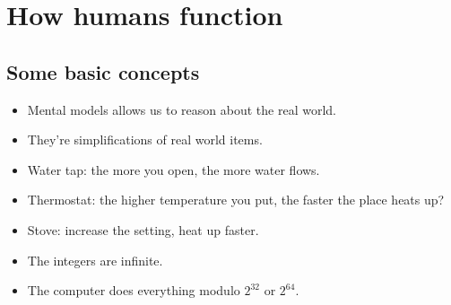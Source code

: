 \mode*




\section{How humans function}

\subsection{Some basic concepts}

\begin{frame}
  \begin{definition}
    \begin{itemize}
      \item Mental models allows us to reason about the real world.
      \item They're simplifications of real world items.
    \end{itemize}
  \end{definition}

  \pause

  \begin{example}
    \begin{itemize}
      \item Water tap: the more you open, the more water flows.
      \item Thermostat: the higher temperature you put, the faster the place 
        heats up?
      \item Stove: increase the setting, heat up faster.
    \end{itemize}
  \end{example}
\end{frame}

\begin{frame}
  \begin{example}[Programming]
    \begin{itemize}
      \item The integers are infinite.
      \item The computer does everything modulo \(2^{32}\) or \(2^{64}\).
    \end{itemize}
  \end{example}
\end{frame}

